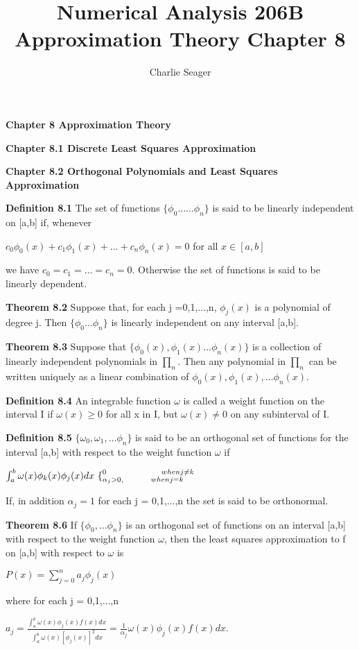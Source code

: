 \documentclass{article}
\begin{document}
\newcommand\tab[1][1cm]{\hspace*{#1}}



\title{Numerical Analysis 206B Approximation Theory Chapter 8}
\author{Charlie Seager}
\maketitle

\textbf {Chapter 8 Approximation Theory}

\textbf {Chapter 8.1 Discrete Least Squares Approximation}

\textbf {Chapter 8.2 Orthogonal Polynomials and Least Squares Approximation}

\textbf {Definition 8.1} The set of functions $\{\phi_0 \dots \dots \phi_n\}$ is said to be linearly independent on [a,b] if, whenever
\begin{center}
$c_0 \phi_0 (x) + c_1 \phi_1(x) + \dots + c_n \phi_n (x) = 0$ \tab for all $x \in [a,b]$
\end{center}
we have $c_0 = c_1 = \dots = c_n = 0$. Otherwise the set of functions is said to be linearly dependent.

\textbf {Theorem 8.2} Suppose that, for each j =0,1,...,n, $\phi_j (x)$ is a polynomial of degree j. Then $\{ \phi_0 \dots \phi_n \}$ is linearly independent on any interval [a,b].

\textbf {Theorem 8.3} Suppose that $\{ \phi_0 (x), \phi_1 (x) \dots \phi_n(x)\}$ is a collection of linearly independent polynomials in $\prod_n$. Then any polynomial in $\prod_n$ can be written uniquely as a linear combination of $\phi_0 (x), \phi_1 (x), \dots \phi_n (x).$

\textbf {Definition 8.4} An integrable function $\omega$ is called a weight function on the interval I if $\omega (x) \geq 0$ for all x in I, but $\omega(x) \neq 0$ on any subinterval of I.

\textbf {Definition 8.5} $\{ \omega_0, \omega_1, \dots \phi_n \}$ is said to be an orthogonal set of functions for the interval [a,b] with respect to the weight function $\omega$ if
\begin{center}
$\int_a^b \omega(x) \phi_k (x) \phi_j (x) dx \ \{^{0 \tab \tab when j \neq k}_{\alpha_j > 0, \tab when j = k}$
\end{center}
If, in addition $\alpha_j = 1$ for each j = 0,1,...,n the set is said to be orthonormal.

\textbf {Theorem 8.6} If $\{ \phi_0, \dots \phi_n \}$ is an orthogonal set of functions  on an interval [a,b] with respect to the weight function $\omega$, then the least squares approximation to f on [a,b] with respect to $\omega$ is 
\begin{center}
$P(x) = \sum_{j=0}^{n} a_j \phi_j (x)$
\end{center}
where for each j = 0,1,...,n
\begin{center}
$a_j = \frac { \int_{a}^{b} \omega (x) \phi_{j} (x) f(x) dx } {\int_{a}^{b} \omega (x) [\phi_{j} (x) ]^{2} dx} = \frac {1} {\alpha_j} \omega(x) \phi_{j} (x) f(x) dx.$
\end{center}
\end{document}
